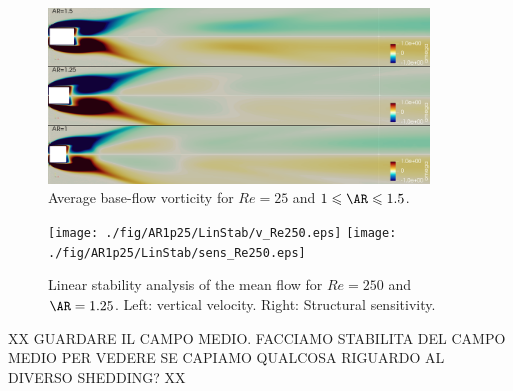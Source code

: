 \begin{figure}
  \centering
  \includegraphics[width=0.9\textwidth]{./fig/AR1s/mean_vort_Re250.png}
  \caption{Average base-flow vorticity for $Re=25$ and $1 \le \AR \le 1.5$.}
  \label{fig:av_bf2}
\end{figure}

\begin{figure}
  \centering
  \texttt{[image: ./fig/AR1p25/LinStab/v\_Re250.eps]}
  \texttt{[image: ./fig/AR1p25/LinStab/sens\_Re250.eps]}
  \caption{Linear stability analysis of the mean flow for $Re=250$ and $\AR=1.25$. Left: vertical velocity. Right: Structural sensitivity.}
  \label{fig:MF_stab}
\end{figure}

XX GUARDARE IL CAMPO MEDIO. FACCIAMO STABILITA DEL CAMPO MEDIO PER VEDERE SE CAPIAMO QUALCOSA RIGUARDO AL DIVERSO SHEDDING? XX


